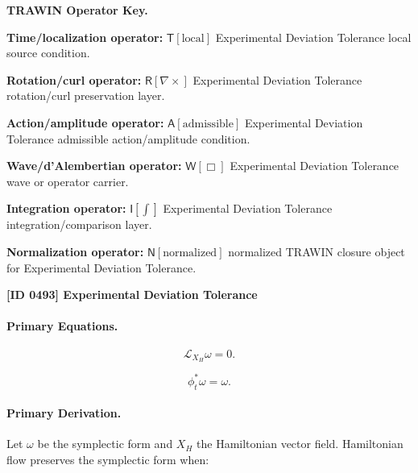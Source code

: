 \par\vspace{0.45\baselineskip}
\noindent\begin{minipage}[t]{\linewidth}
\begingroup
\small
\raggedright
\textbf{TRAWIN Operator Key.}\par
\noindent\textbf{Time/localization operator:} $\mathsf{T}\!\left[\mathrm{local}\right]$ Experimental Deviation Tolerance local source condition.\par
\noindent\textbf{Rotation/curl operator:} $\mathsf{R}\!\left[\nabla\times\right]$ Experimental Deviation Tolerance rotation/curl preservation layer.\par
\noindent\textbf{Action/amplitude operator:} $\mathsf{A}\!\left[\mathrm{admissible}\right]$ Experimental Deviation Tolerance admissible action/amplitude condition.\par
\noindent\textbf{Wave/d'Alembertian operator:} $\mathsf{W}\!\left[\Box\right]$ Experimental Deviation Tolerance wave or operator carrier.\par
\noindent\textbf{Integration operator:} $\mathsf{I}\!\left[\int\right]$ Experimental Deviation Tolerance integration/comparison layer.\par
\noindent\textbf{Normalization operator:} $\mathsf{N}\!\left[\mathrm{normalized}\right]$ normalized TRAWIN closure object for Experimental Deviation Tolerance.\par
\endgroup
\end{minipage}

\clearpage
\noindent\textbf{[ID 0493] Experimental Deviation Tolerance}\par
\vspace{0.35em}
\paragraph{Primary Equations.}
\begin{equation}
\mathcal{L}_{X_H}\omega=0.
\end{equation}

\begin{equation}
\phi_t^{*}\omega=\omega.
\end{equation}

\paragraph{Primary Derivation.}
Let $\omega$ be the symplectic form and $X_H$ the Hamiltonian vector field.  
Hamiltonian flow preserves the symplectic form when:

